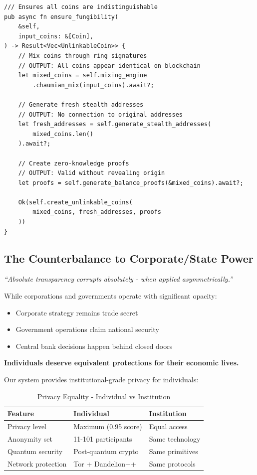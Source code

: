 \documentclass[12pt,a4paper]{article}
\begin{document}
\begin{lstlisting}[style=rustcode, caption=Fungibility Through Cryptographic Mixing]
/// Ensures all coins are indistinguishable
pub async fn ensure_fungibility(
    &self,
    input_coins: &[Coin],
) -> Result<Vec<UnlinkableCoin>> {
    // Mix coins through ring signatures
    // OUTPUT: All coins appear identical on blockchain
    let mixed_coins = self.mixing_engine
        .chaumian_mix(input_coins).await?;

    // Generate fresh stealth addresses
    // OUTPUT: No connection to original addresses
    let fresh_addresses = self.generate_stealth_addresses(
        mixed_coins.len()
    ).await?;

    // Create zero-knowledge proofs
    // OUTPUT: Valid without revealing origin
    let proofs = self.generate_balance_proofs(&mixed_coins).await?;

    Ok(self.create_unlinkable_coins(
        mixed_coins, fresh_addresses, proofs
    ))
}
\end{lstlisting}

\subsection{The Counterbalance to Corporate/State Power}

\textit{``Absolute transparency corrupts absolutely - when applied asymmetrically.''}

While corporations and governments operate with significant opacity:
\begin{itemize}
\item Corporate strategy remains trade secret
\item Government operations claim national security
\item Central bank decisions happen behind closed doors
\end{itemize}

\textbf{Individuals deserve equivalent protections for their economic lives.}

Our system provides institutional-grade privacy for individuals:

\begin{table}[h]
\centering
\begin{tabular}{lll}
\toprule
\textbf{Feature} & \textbf{Individual} & \textbf{Institution} \\
\midrule
Privacy level & Maximum (0.95 score) & Equal access \\
Anonymity set & 11-101 participants & Same technology \\
Quantum security & Post-quantum crypto & Same primitives \\
Network protection & Tor + Dandelion++ & Same protocols \\
\bottomrule
\end{tabular}
\caption{Privacy Equality - Individual vs Institution}
\end{table}
\end{document}
